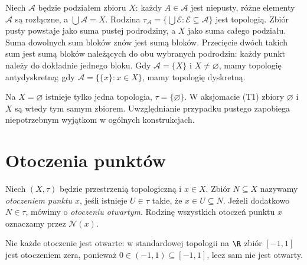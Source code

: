\begin{przyklad}
\label{ex:topog-podzial}
Niech $\mathcal A$ będzie podziałem zbioru $X$:
każdy $A\in\mathcal A$ jest niepusty, różne elementy
$\mathcal A$ są rozłączne, a $\bigcup\mathcal A=X$.
Rodzina $\tau_{\mathcal A}=\{\bigcup\mathcal E:
\mathcal E\subseteq\mathcal A\}$ jest topologią.
Zbiór pusty powstaje jako suma pustej podrodziny,
a $X$ jako suma całego podziału. Suma dowolnych sum
bloków znów jest sumą bloków. Przecięcie dwóch takich
sum jest sumą bloków należących do obu wybranych
podrodzin: każdy punkt należy do dokładnie jednego bloku.
Gdy $\mathcal A=\{X\}$ i $X\neq\varnothing$, mamy
topologię antydyskretną; gdy
$\mathcal A=\{\{x\}:x\in X\}$, mamy topologię dyskretną.
\end{przyklad}

\begin{uwaga}
\label{rem:topog-pusta}
Na $X=\varnothing$ istnieje tylko jedna topologia,
$\tau=\{\varnothing\}$. W aksjomacie (T1) zbiory
$\varnothing$ i $X$ są wtedy tym samym zbiorem.
Uwzględnianie przypadku pustego zapobiega
niepotrzebnym wyjątkom w ogólnych konstrukcjach.
\end{uwaga}

\section{Otoczenia punktów}
\label{sec:topog-otoczenia}

\begin{definicja}
\label{def:topog-otoczenie}
Niech $(X,\tau)$ będzie przestrzenią topologiczną i $x\in X$.
Zbiór $N\subseteq X$ nazywamy \emph{otoczeniem punktu $x$},
jeśli istnieje $U\in\tau$ takie, że $x\in U\subseteq N$.
Jeżeli dodatkowo $N\in\tau$, mówimy o
\emph{otoczeniu otwartym}. Rodzinę wszystkich otoczeń
punktu $x$ oznaczamy przez $\mathcal N(x)$.
\end{definicja}

Nie każde otoczenie jest otwarte: w standardowej topologii
na $\R$ zbiór $[-1,1]$ jest otoczeniem zera, ponieważ
$0\in(-1,1)\subseteq[-1,1]$, lecz sam nie jest otwarty.

